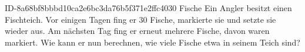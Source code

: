 \begin{exercise}
      {ID-8a68bf8bbbd10ca2e6bc3da76b5f371e2ffc4030}
      {Fische}
  \ifproblem\problem
    Ein Angler besitzt einen Fischteich. Vor einigen Tagen fing er 30 Fische,
    markierte sie und setzte sie wieder aus. Am nächsten Tag fing er erneut
    mehrere Fische, davon waren  markiert. Wie kann er nun berechnen,
    wie viele Fische etwa in seinem Teich sind?
  \fi
\end{exercise}
